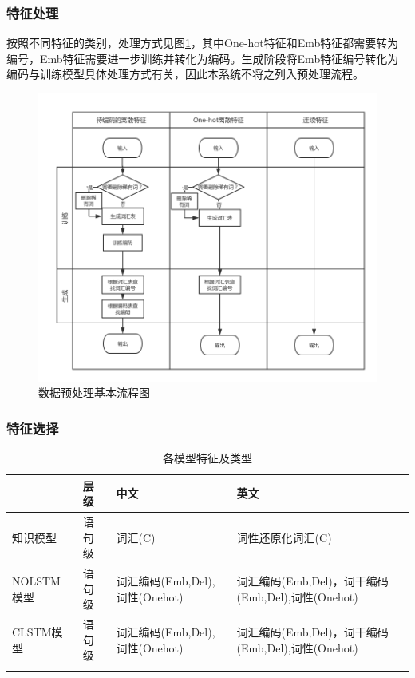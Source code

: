 \subsubsection{特征处理}
按照不同特征的类别，处理方式见图\ref{fig:featureprocessing}，其中One-hot特征和Emb特征都需要转为编号，Emb特征需要进一步训练并转化为编码。生成阶段将Emb特征编号转化为编码与训练模型具体处理方式有关，因此本系统不将之列入预处理流程。
\begin{figure}[!htbp]
\begin{center}
\includegraphics[width=\textwidth]{graphic/featurepocessing.png}
\caption{数据预处理基本流程图 \label{fig:featureprocessing}}
\end{center}
\end{figure}
\subsubsection{特征选择}
\begin{center}
\begin{longtabu} to \textwidth{X|X|X[3]|X[3]} 
\toprule
& 层级 & 中文 & 英文\\
\hline
知识模型 & 语句级 & 词汇(C) & 词性还原化词汇(C)\\
\hline
NOLSTM模型 & 语句级 & 词汇编码(Emb,Del),词性(Onehot) & 词汇编码(Emb,Del)，词干编码(Emb,Del),词性(Onehot)\\
\hline
CLSTM模型 & 语句级 & 词汇编码(Emb,Del),词性(Onehot) & 词汇编码(Emb,Del)，词干编码(Emb,Del),词性(Onehot)\\
\bottomrule
\caption{各模型特征及类型}
\end{longtabu}
\end{center}

